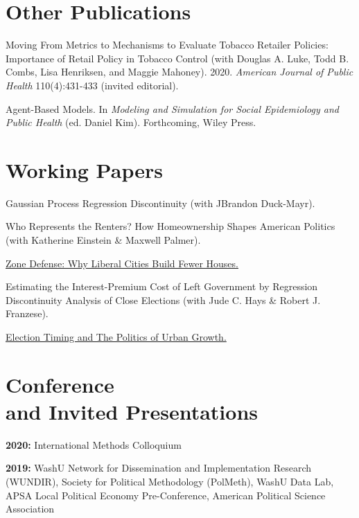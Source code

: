 \documentclass[margin,line]{res}
\newenvironment{publist}{
	\begin{list}{}{%
			\setlength{\itemsep}{0.15in}
			\setlength{\parsep}{0in} \setlength{\parskip}{0in}
			\setlength{\topsep}{0in} \setlength{\partopsep}{0in} 
			\setlength{\leftmargin}{0.15in}
			\setlength{\itemindent}{-0.15in}}}
		{\end{list}}
\begin{document}
\begin{resume}
\section{\sc Other Publications}


\begin{publist}
	\item Moving From Metrics to Mechanisms to Evaluate Tobacco Retailer Policies: Importance of Retail Policy in Tobacco Control (with Douglas A. Luke, Todd B. Combs, Lisa Henriksen, and Maggie Mahoney). 2020. \textit{American Journal of Public Health} 110(4):431-433 (invited editorial).
	\item Agent-Based Models. In \textit{Modeling and Simulation for Social Epidemiology and Public Health} (ed. Daniel Kim). Forthcoming, Wiley Press. 
\end{publist}



\section{\sc Working Papers}

\begin{publist}
	\item Gaussian Process Regression Discontinuity (with JBrandon Duck-Mayr).
	\item Who Represents the Renters? How Homeownership Shapes American Politics (with Katherine Einstein \& Maxwell Palmer). 
	\item \href{https://joeornstein.github.io/papers/ornstein-zone-defense.pdf}{Zone Defense: Why Liberal Cities Build Fewer Houses.}
	\item Estimating the Interest-Premium Cost of Left Government by Regression Discontinuity Analysis of Close Elections (with Jude C. Hays \& Robert J. Franzese).
	\item \href{https://joeornstein.github.io/ElectionTiming.html}{Election Timing and The Politics of Urban Growth.}
\end{publist}

\section{\sc Conference \\and Invited Presentations}

\textbf{2020:} International Methods Colloquium 

\textbf{2019:} WashU Network for Dissemination and Implementation Research (WUNDIR), Society for Political Methodology (PolMeth), WashU Data Lab, APSA Local Political Economy Pre-Conference, American Political Science Association


\end{resume}
\end{document}
